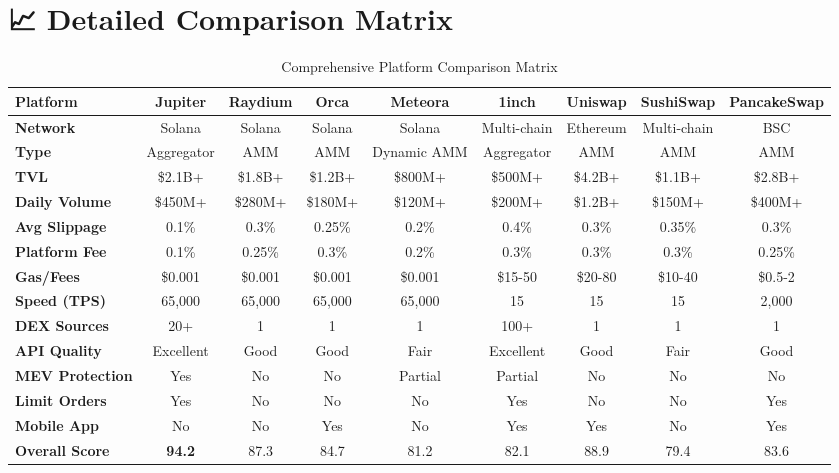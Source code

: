 \documentclass[11pt,a4paper]{article}
\begin{document}
\section{📈 Detailed Comparison Matrix}

\begin{sidewaystable}
\centering
\begin{tabular}{|l|c|c|c|c|c|c|c|c|}
\hline
\textbf{Platform} & \textbf{Jupiter} & \textbf{Raydium} & \textbf{Orca} & \textbf{Meteora} & \textbf{1inch} & \textbf{Uniswap} & \textbf{SushiSwap} & \textbf{PancakeSwap} \\
\hline
\textbf{Network} & Solana & Solana & Solana & Solana & Multi-chain & Ethereum & Multi-chain & BSC \\
\hline
\textbf{Type} & Aggregator & AMM & AMM & Dynamic AMM & Aggregator & AMM & AMM & AMM \\
\hline
\textbf{TVL} & \$2.1B+ & \$1.8B+ & \$1.2B+ & \$800M+ & \$500M+ & \$4.2B+ & \$1.1B+ & \$2.8B+ \\
\hline
\textbf{Daily Volume} & \$450M+ & \$280M+ & \$180M+ & \$120M+ & \$200M+ & \$1.2B+ & \$150M+ & \$400M+ \\
\hline
\textbf{Avg Slippage} & 0.1\% & 0.3\% & 0.25\% & 0.2\% & 0.4\% & 0.3\% & 0.35\% & 0.3\% \\
\hline
\textbf{Platform Fee} & 0.1\% & 0.25\% & 0.3\% & 0.2\% & 0.3\% & 0.3\% & 0.3\% & 0.25\% \\
\hline
\textbf{Gas/Fees} & \$0.001 & \$0.001 & \$0.001 & \$0.001 & \$15-50 & \$20-80 & \$10-40 & \$0.5-2 \\
\hline
\textbf{Speed (TPS)} & 65,000 & 65,000 & 65,000 & 65,000 & 15 & 15 & 15 & 2,000 \\
\hline
\textbf{DEX Sources} & 20+ & 1 & 1 & 1 & 100+ & 1 & 1 & 1 \\
\hline
\textbf{API Quality} & Excellent & Good & Good & Fair & Excellent & Good & Fair & Good \\
\hline
\textbf{MEV Protection} & Yes & No & No & Partial & Partial & No & No & No \\
\hline
\textbf{Limit Orders} & Yes & No & No & No & Yes & No & No & Yes \\
\hline
\textbf{Mobile App} & No & No & Yes & No & Yes & Yes & No & Yes \\
\hline
\textbf{Overall Score} & \textbf{94.2} & 87.3 & 84.7 & 81.2 & 82.1 & 88.9 & 79.4 & 83.6 \\
\hline
\end{tabular}
\caption{Comprehensive Platform Comparison Matrix}
\end{sidewaystable}
\end{document}
